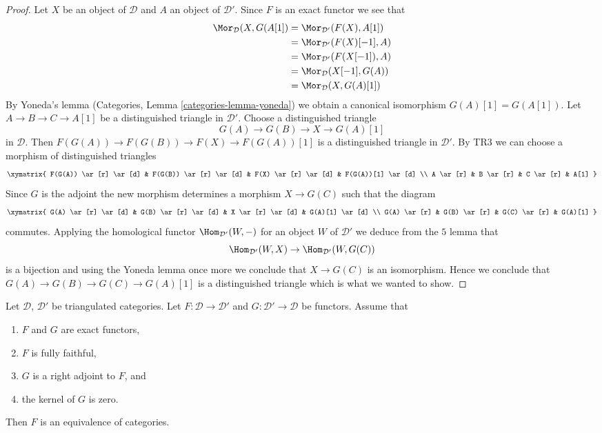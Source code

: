 \begin{proof}
Let $X$ be an object of $\mathcal{D}$ and
$A$ an object of $\mathcal{D}'$. Since $F$ is an exact functor we see that
\begin{align*}
\Mor_\mathcal{D}(X, G(A[1])
& =
\Mor_{\mathcal{D}'}(F(X), A[1]) \\
& =
\Mor_{\mathcal{D}'}(F(X)[-1], A) \\
& =
\Mor_{\mathcal{D}'}(F(X[-1]), A) \\
& =
\Mor_\mathcal{D}(X[-1], G(A)) \\
& =
\Mor_\mathcal{D}(X, G(A)[1])
\end{align*}
By Yoneda's lemma (Categories, Lemma \ref{categories-lemma-yoneda})
we obtain a canonical isomorphism $G(A)[1] = G(A[1])$.
Let $A \to B \to C \to A[1]$ be a distinguished triangle in $\mathcal{D}'$.
Choose a distinguished triangle
$$
G(A) \to G(B) \to X \to G(A)[1]
$$
in $\mathcal{D}$. Then $F(G(A)) \to F(G(B)) \to F(X) \to F(G(A))[1]$
is a distinguished triangle in $\mathcal{D}'$. By TR3 we can choose
a morphism of distinguished triangles
$$
\xymatrix{
F(G(A)) \ar[r] \ar[d] & F(G(B)) \ar[r] \ar[d] & F(X) \ar[r] \ar[d] &
F(G(A))[1] \ar[d] \\
A \ar[r] & B \ar[r] & C \ar[r] & A[1]
}
$$
Since $G$ is the adjoint the new morphism determines a morphism $X \to G(C)$
such that the diagram
$$
\xymatrix{
G(A) \ar[r] \ar[d] & G(B) \ar[r] \ar[d] & X \ar[r] \ar[d] & G(A)[1] \ar[d] \\
G(A) \ar[r] & G(B) \ar[r] & G(C) \ar[r] & G(A)[1]
}
$$
commutes. Applying the homological functor $\Hom_{\mathcal{D}'}(W, -)$
for an object $W$ of $\mathcal{D}'$ we deduce from the $5$ lemma that
$$
\Hom_{\mathcal{D}'}(W, X) \to \Hom_{\mathcal{D}'}(W, G(C))
$$
is a bijection and using the Yoneda lemma once more we conclude that
$X \to G(C)$ is an isomorphism. Hence we conclude that
$G(A) \to G(B) \to G(C) \to G(A)[1]$ is a distinguished triangle
which is what we wanted to show.
\end{proof}

\begin{lemma}
\label{lemma-fully-faithful-adjoint-kernel-zero}
Let $\mathcal{D}$, $\mathcal{D}'$ be triangulated categories.
Let $F : \mathcal{D} \to \mathcal{D}'$ and
$G : \mathcal{D}' \to \mathcal{D}$ be functors. Assume that
\begin{enumerate}
\item $F$ and $G$ are exact functors,
\item $F$ is fully faithful,
\item $G$ is a right adjoint to $F$, and
\item the kernel of $G$ is zero.
\end{enumerate}
Then $F$ is an equivalence of categories.
\end{lemma}

